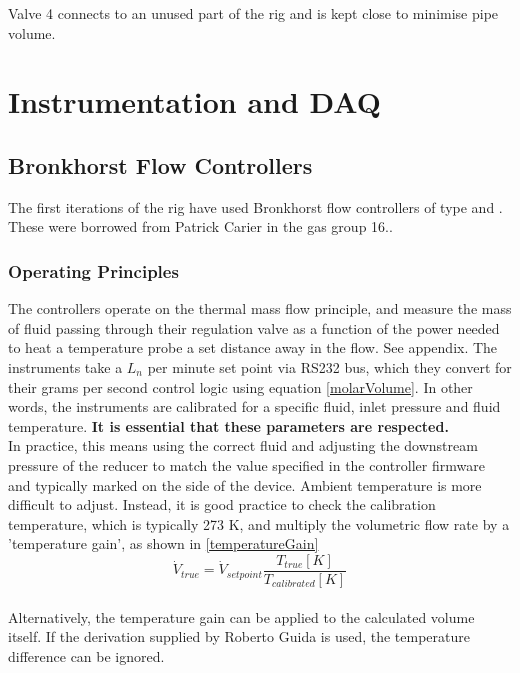 \documentclass{report}
\begin{document}
Valve 4 connects to an unused part of the rig and is kept close to minimise pipe volume.

\section{Instrumentation and DAQ}
\subsection{Bronkhorst Flow Controllers}
The first iterations of the rig have used Bronkhorst flow controllers of type  and . These were borrowed from Patrick Carier in the gas group 16.. 
\subsubsection{Operating Principles} \label{sec:operatingPrinciples}
The controllers operate on the thermal mass flow principle, and measure the mass of fluid passing through their regulation valve as a function of the power needed to heat a temperature probe a set distance away in the flow. See appendix. The instruments take a $L_n$ per minute set point via RS232 bus, which they convert for their grams per second control logic using equation \eqref{molarVolume}. In other words, the instruments are calibrated for a specific fluid, inlet pressure and fluid temperature. \textbf{It is essential that these parameters are respected.}
\\
In practice, this means using the correct fluid and adjusting the downstream pressure of the reducer to match the value specified in the controller firmware and typically marked on the side of the device. Ambient temperature is more difficult to adjust. Instead, it is good practice to check the calibration temperature, which is typically 273 K, and multiply the volumetric flow rate by a 'temperature gain', as shown in \eqref{temperatureGain}
\begin{equation} \label{temperatureGain}
\dot{V}_{true} = \dot{V}_{set point}\frac{T_{true}[K]}{T_{calibrated}[K]}
\end{equation}
\\
Alternatively, the temperature gain can be applied to the calculated volume itself. If the derivation supplied by Roberto Guida is used, the temperature difference can be ignored. \\
\end{document}

